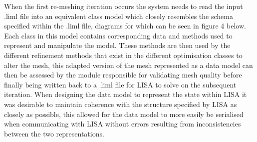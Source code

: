\noindent
When the first re-meshing iteration occurs the system needs to read the input .liml file into an equivalent class model which closely resembles the schema specified within the .liml file, diagrams for which can be seen in figure 4 below. Each class in this model contains corresponding data and methods used to represent and manipulate the model. These methods are then used by the different refinement methods that exist in the different optimisation classes to alter the mesh, this adapted version of the mesh represented as a data model can then be assessed by the module responsible for validating mesh quality before finally being written back to a .liml file for LISA to solve on the subsequent iteration. When designing the data model to represent the state within LISA it was desirable to maintain coherence with the structure specified by LISA as closely as possible, this allowed for the data model to more easily be serialised when communicating with LISA without errors resulting from inconsistencies between the two representations. 

